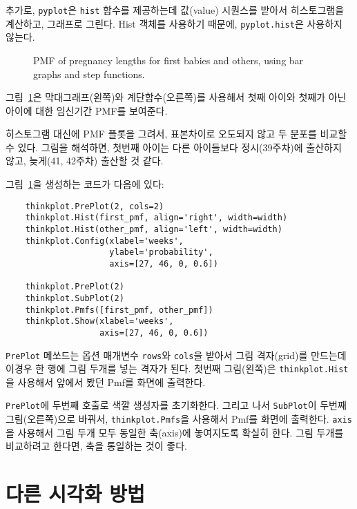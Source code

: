 추가로, {\tt pyplot}은 {\tt hist} 함수를 제공하는데 값(value) 시퀀스를 받아서
히스토그램을 계산하고, 그래프로 그린다.
Hist 객체를 사용하기 때문에, {\tt pyplot.hist}은 사용하지 않는다.

\begin{figure}
\caption{PMF of pregnancy lengths for first babies and others, using
  bar graphs and step functions.}
\label{probability_nsfg_pmf}
\end{figure}

그림~\ref{probability_nsfg_pmf}은 막대그래프(왼쪽)와 계단함수(오른쪽)를 사용해서 첫째 아이와 첫째가 아닌 아이에 대한
임신기간 PMF를 보여준다.

히스토그램 대신에 PMF 플롯을 그려서, 표본차이로 오도되지 않고 두 분포를 비교할 수 있다.
그림을 해석하면, 첫번째 아이는 다른 아이들보다 정시(39주차)에 출산하지 않고, 늦게(41, 42주차) 출산할 것 같다.

그림~\ref{probability_nsfg_pmf}을 생성하는 코드가 다음에 있다:

\begin{verbatim}
    thinkplot.PrePlot(2, cols=2)
    thinkplot.Hist(first_pmf, align='right', width=width)
    thinkplot.Hist(other_pmf, align='left', width=width)
    thinkplot.Config(xlabel='weeks',
                     ylabel='probability',
                     axis=[27, 46, 0, 0.6])

    thinkplot.PrePlot(2)
    thinkplot.SubPlot(2)
    thinkplot.Pmfs([first_pmf, other_pmf])
    thinkplot.Show(xlabel='weeks',
                   axis=[27, 46, 0, 0.6])
\end{verbatim}

{\tt PrePlot} 메쏘드는 옵션 매개변수 {\tt rows}와 {\tt cols}을 받아서 
그림 격자(grid)를 만드는데 이경우 한 행에 그림 두개를 넣는 격자가 된다.
첫번째 그림(왼쪽)은 {\tt thinkplot.Hist}을 사용해서 앞에서 봤던 Pmf를 화면에 출력한다. 


{\tt PrePlot}에 두번째 호출로 색깔 생성자를 초기화한다. 그리고 나서 
{\tt SubPlot}이 두번째 그림(오른쪽)으로 바꿔서, {\tt thinkplot.Pmfs}을 사용해서 Pmf를 화면에 출력한다.
{\tt axis}을 사용해서 그림 두개 모두 동일한 축(axis)에 놓여지도록 확실히 한다.
그림 두개를 비교하려고 한다면, 축을 통일하는 것이 좋다.


\section{다른 시각화 방법}
\label{visualization}

